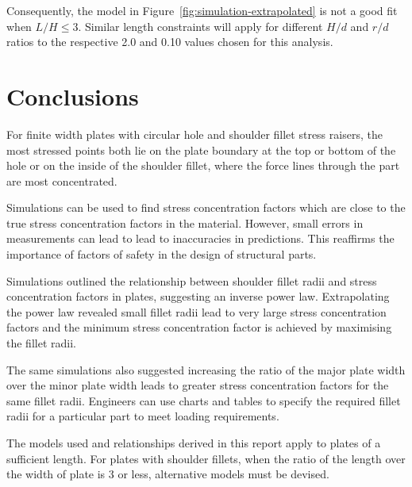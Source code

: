 \documentclass[a4paper,11pt,twocolumn]{article}
\begin{document}
Consequently, the model in Figure~\vref{fig:simulation-extrapolated} is not a
good fit when $L/H \leq 3$. Similar length constraints will apply for different
$H/d$ and $r/d$ ratios to the respective 2.0 and 0.10 values chosen for this
analysis.

\section{Conclusions}

For finite width plates with circular hole and shoulder fillet stress raisers,
the most stressed points both lie on the plate boundary at the top or bottom of
the hole or on the inside of the shoulder fillet, where the force lines through
the part are most concentrated.

Simulations can be used to find stress concentration factors which are close to
the true stress concentration factors in the material. However, small errors in
measurements can lead to lead to inaccuracies in predictions. This reaffirms the
importance of factors of safety in the design of structural parts.

Simulations outlined the relationship between shoulder fillet radii and stress
concentration factors in plates, suggesting an inverse power law. Extrapolating
the power law revealed small fillet radii lead to very large stress
concentration factors and the minimum stress concentration factor is achieved by
maximising the fillet radii.

The same simulations also suggested increasing the ratio of the major plate
width over the minor plate width leads to greater stress concentration factors
for the same fillet radii. Engineers can use charts and tables to specify the
required fillet radii for a particular part to meet loading requirements.

The models used and relationships derived in this report apply to plates of a
sufficient length. For plates with shoulder fillets, when the ratio of the
length over the width of plate is 3 or less, alternative models must be devised.

\printbibliography
\end{document}
